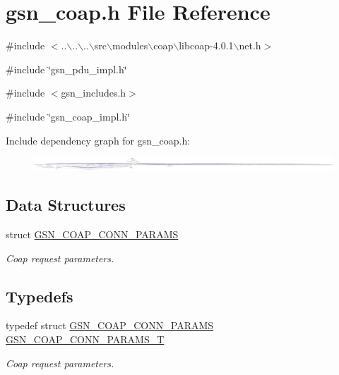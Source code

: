 \hypertarget{a00478}{
\section{gsn\_\-coap.h File Reference}
\label{a00478}
}
{\ttfamily \#include $<$..$\backslash$..$\backslash$..$\backslash$src$\backslash$modules$\backslash$coap$\backslash$libcoap-\/4.0.1$\backslash$net.h$>$}\par
{\ttfamily \#include \char`\"{}gsn\_\-pdu\_\-impl.h\char`\"{}}\par
{\ttfamily \#include $<$gsn\_\-includes.h$>$}\par
{\ttfamily \#include \char`\"{}gsn\_\-coap\_\-impl.h\char`\"{}}\par
Include dependency graph for gsn\_\-coap.h:
\nopagebreak
\begin{figure}[H]
\begin{center}
\leavevmode
\includegraphics[width=400pt]{a00703}
\end{center}
\end{figure}
\subsection*{Data Structures}
\begin{DoxyCompactItemize}
\item 
struct \hyperlink{a00040}{GSN\_\-COAP\_\-CONN\_\-PARAMS}
\begin{DoxyCompactList}\small\item\em Coap request parameters. \end{DoxyCompactList}\end{DoxyCompactItemize}
\subsection*{Typedefs}
\begin{DoxyCompactItemize}
\item 
typedef struct \hyperlink{a00040}{GSN\_\-COAP\_\-CONN\_\-PARAMS} \hyperlink{a00478_a4a8534a28c65bae68622c74ab743d4cc}{GSN\_\-COAP\_\-CONN\_\-PARAMS\_\-T}
\begin{DoxyCompactList}\small\item\em Coap request parameters. \end{DoxyCompactList}\end{DoxyCompactItemize}
